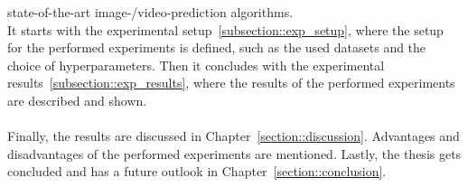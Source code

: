  state-of-the-art image-/video-prediction algorithms.\\
 It starts with the experimental setup~\ref{subsection::exp_setup},
 where the setup for the performed experiments is defined, such as the used datasets and the choice of hyperparameters. Then it concludes with the
 experimental results~\ref{subsection::exp_results}, where the results of the performed experiments are described and shown.
 \\\\
 Finally, the results are discussed in Chapter~\ref{section::discussion}. Advantages and disadvantages of the performed experiments are mentioned.
 Lastly, the thesis gets concluded and has a future outlook in Chapter~\ref{section::conclusion}.